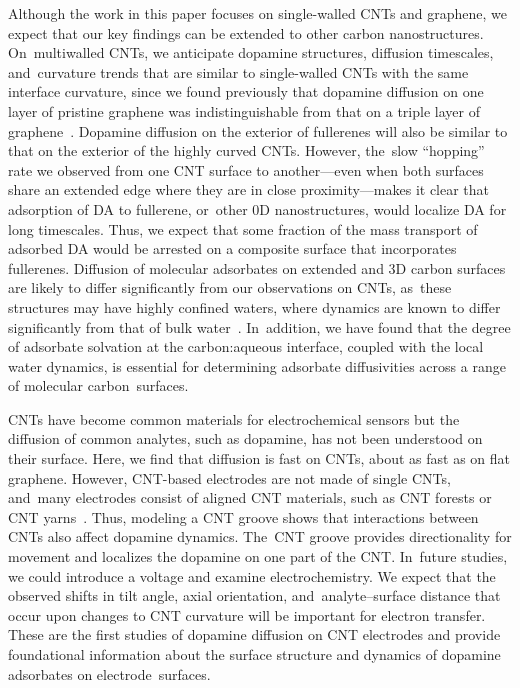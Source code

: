 \documentclass[molecules,article,accept,pdftex,moreauthors]{Definitions/mdpi}
\begin{document}
Although the work in this paper focuses on single-walled CNTs and graphene, we expect that our key findings can be extended to other carbon nanostructures. On~multiwalled CNTs, we anticipate dopamine structures, diffusion timescales, and~curvature trends that are similar to single-walled CNTs with the same interface curvature, since we found previously that dopamine diffusion on one layer of pristine graphene was indistinguishable from that on a triple layer of graphene~\cite{Jia2022}. Dopamine diffusion on the exterior of fullerenes will also be similar to that on the exterior of the highly curved CNTs. However, the~slow ``hopping'' rate we observed from one CNT surface to another---even when both surfaces share an extended edge where they are in close proximity---makes it clear that adsorption of DA to fullerene, or~other 0D nanostructures, would localize DA for long timescales. Thus, we expect that some fraction of the mass transport of adsorbed DA would be arrested on a composite surface that incorporates fullerenes. Diffusion of molecular adsorbates on extended and 3D carbon surfaces are likely to differ significantly from our observations on CNTs, as~these structures may have highly confined waters, where dynamics are known to differ significantly from that of bulk water~\cite{Zheng2012, Hirunsit2007, Limmer2012}. In~addition, we have found that the degree of adsorbate solvation at the carbon:aqueous interface, coupled with the local water dynamics, is essential for determining adsorbate diffusivities across a range of molecular carbon~surfaces.
 
CNTs have become common materials for electrochemical sensors but the diffusion of common analytes, such as dopamine, has not been understood on their surface. Here, we find that diffusion is fast on CNTs, about as fast as on flat graphene. However, CNT-based electrodes are not made of single CNTs, and~many electrodes consist of aligned CNT materials, such as CNT forests or CNT yarns~\cite{Yang2016,Xiao2012,Kim2020}. Thus, modeling a CNT groove shows that interactions between CNTs also affect dopamine dynamics. The~CNT groove provides directionality for movement and localizes the dopamine on one part of the CNT.  In~future studies, we could introduce a voltage and examine electrochemistry. We expect that the observed shifts in tilt angle, axial orientation, and~analyte--surface distance that occur upon changes to CNT curvature will be important for electron transfer. These are the first studies of dopamine diffusion on CNT electrodes and provide foundational information about the surface structure and dynamics of dopamine adsorbates on electrode~surfaces. 
\end{document}
